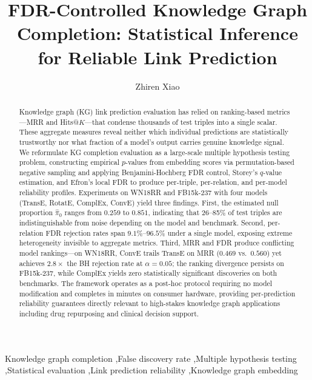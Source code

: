 \documentclass[review]{elsarticle}
\begin{document}
\begin{frontmatter}

\title{FDR-Controlled Knowledge Graph Completion: Statistical Inference for Reliable Link Prediction}

\author[1]{Zhiren Xiao}
\address[1]{Guangdong University of Finance, Guangzhou, China}%

\begin{abstract}
Knowledge graph (KG) link prediction evaluation has relied on ranking-based metrics---MRR and Hits@$K$---that condense thousands of test triples into a single scalar. These aggregate measures reveal neither which individual predictions are statistically trustworthy nor what fraction of a model's output carries genuine knowledge signal.
We reformulate KG completion evaluation as a large-scale multiple hypothesis testing problem, constructing empirical $p$-values from embedding scores via permutation-based negative sampling and applying Benjamini-Hochberg FDR control, Storey's $q$-value estimation, and Efron's local FDR to produce per-triple, per-relation, and per-model reliability profiles.
Experiments on WN18RR and FB15k-237 with four models (TransE, RotatE, ComplEx, ConvE) yield three findings.
First, the estimated null proportion $\hat{\pi}_0$ ranges from $0.259$ to $0.851$, indicating that 26--85\% of test triples are indistinguishable from noise depending on the model and benchmark.
Second, per-relation FDR rejection rates span $9.1\%$--$96.5\%$ under a single model, exposing extreme heterogeneity invisible to aggregate metrics.
Third, MRR and FDR produce conflicting model rankings---on WN18RR, ConvE trails TransE on MRR ($0.469$ vs.\ $0.560$) yet achieves $2.8\times$ the BH rejection rate at $\alpha = 0.05$; the ranking divergence persists on FB15k-237, while ComplEx yields zero statistically significant discoveries on both benchmarks.
The framework operates as a post-hoc protocol requiring no model modification and completes in minutes on consumer hardware, providing per-prediction reliability guarantees directly relevant to high-stakes knowledge graph applications including drug repurposing and clinical decision support.
\end{abstract}

\begin{keyword}
Knowledge graph completion \sep False discovery rate \sep Multiple hypothesis testing \sep Statistical evaluation \sep Link prediction reliability \sep Knowledge graph embedding
\end{keyword}

\end{frontmatter}
\end{document}
